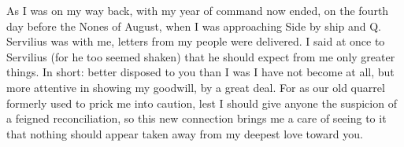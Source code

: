  As I was on my way back, with my year of command now ended, on the fourth day before the Nones of August, when I was approaching Side by ship and Q. Servilius was with me, letters from my people were delivered. I said at once to Servilius (for he too seemed shaken) that he should expect from me only greater things. In short: better disposed to you than I was I have not become at all, but more attentive in showing my goodwill, by a great deal. For as our old quarrel formerly used to prick me into caution, lest I should give anyone the suspicion of a feigned reconciliation, so this new connection brings me a care of seeing to it that nothing should appear taken away from my deepest love toward you.
